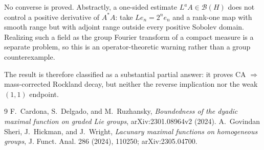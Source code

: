 \documentclass[11pt]{article}
\begin{document}
No converse is proved.  Abstractly, a one-sided estimate $L^aA\in\mathcal
B(H)$ does not control a positive derivative of $A^*A$: take
$Le_n=2^ne_n$ and a rank-one map with smooth range but with adjoint range
outside every positive Sobolev domain.  Realizing such a field as the group
Fourier transform of a compact measure is a separate problem, so this is an
operator-theoretic warning rather than a group counterexample.

The result is therefore classified as a substantial partial answer: it proves
CA $\Rightarrow$ mass-corrected Rockland decay, but neither the reverse
implication nor the weak $(1,1)$ endpoint.

\begin{thebibliography}{9}
F.~Cardona, S.~Delgado, and M.~Ruzhansky,
\emph{Boundedness of the dyadic maximal function on graded Lie groups},
arXiv:2301.08964v2 (2024).
A.~Govindan Sheri, J.~Hickman, and J.~Wright,
\emph{Lacunary maximal functions on homogeneous groups},
J. Funct. Anal. 286 (2024), 110250; arXiv:2305.04700.
\end{thebibliography}
\end{document}
